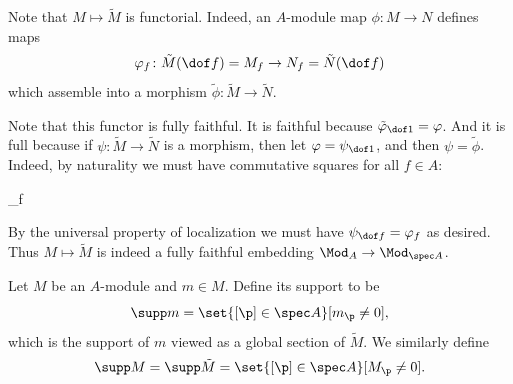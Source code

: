 \enote

Note that $M\mapsto\tilde M$ is functorial.
Indeed, an $A$-module map $\phi\colon M\to N$ defines maps
$$ \phi_f \colon \tilde M(\dof f) = M_f \to N_f = \tilde N(\dof f) $$
which assemble into a morphism $\tilde\phi\colon\tilde M\to\tilde N$.

Note that this functor is fully faithful.
It is faithful because $\tilde\phi_{\dof1}=\phi$.
And it is full because if $\psi\colon\tilde M\to\tilde N$ is a morphism, then let $\phi=\psi_{\dof1}$, and then $\psi=\tilde\phi$.
Indeed, by naturality we must have commutative squares for all $f\in A$:

    {\phi}{\psi_{\dof f}}{}{}

By the universal property of localization we must have $\psi_{\dof f}=\phi_f$ as desired.
Thus $M\mapsto\tilde M$ is indeed a fully faithful embedding $\Mod_A\to\Mod_{\spec A}$.

\bdefn

    Let $M$ be an $A$-module and $m\in M$.
    Define its {\emphcolor support} to be
    $$ \supp m = \set{[\p]\in\spec A}[m_\p\neq0] , $$
    which is the support of $m$ viewed as a global section of $\tilde M$.
    We similarly define
    $$ \supp M = \supp\tilde M = \set{[\p]\in\spec A}[M_\p\neq0] . $$

\edefn

